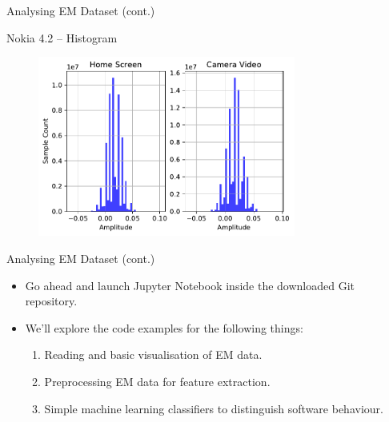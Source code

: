 \documentclass[handout]{beamer}
\begin{document}
\begin{frame}{Analysing EM Dataset (cont.)}  

	\footnotesize
	Nokia 4.2 -- Histogram

	\begin{figure}
		\includegraphics[width=240pt]{figures/data-distribution-plots-Nokia42.pdf}
	\end{figure}

\end{frame}


\begin{frame}{Analysing EM Dataset (cont.)}  

	\begin{itemize}
	\footnotesize
	\item Go ahead and launch Jupyter Notebook inside the downloaded Git repository.
		\vspace{10pt}
	\item We'll explore the code examples for the following things:
		\vspace{10pt}
		\begin{enumerate}
		\footnotesize
		\item Reading and basic visualisation of EM data.
		\vspace{5pt}
		\item Preprocessing EM data for feature extraction.
		\vspace{5pt}
		\item Simple machine learning classifiers to distinguish software behaviour.
		\end{enumerate}
	\end{itemize}

\end{frame}
\end{document}
